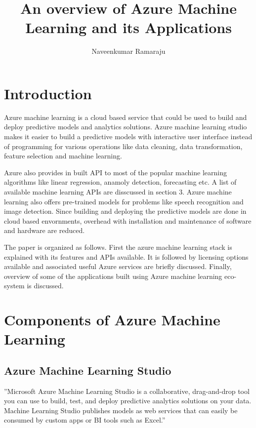 \documentclass[9pt,twocolumn,twoside]{../../styles/osajnl}
\title{An overview of Azure Machine Learning and its Applications}
\author[1]{Naveenkumar Ramaraju}
\affil[1]{School of Informatics and Computing, Bloomington, IN 47408, U.S.A.}
\affil[*]{Corresponding authors: nramraj@umail.iu.edu}
\begin{document}
\maketitle

\section{Introduction}

Azure machine learning is a cloud based service that could be used to
build and deploy predictive models and analytics solutions. Azure
machine learning studio makes it easier to build a predictive models
with interactive user interface instead of programming for various
operations like data cleaning, data transformation, feature selection
and machine learning.

Azure also provides in built API to most of the popular machine
learning algorithms like linear regression, anamoly detection,
forecasting etc. A list of available machine learning APIs are
disscussed in section 3. Azure machine learning also offers
pre-trained models for problems like speech recognition and image
detection. Since building and deploying the predictive
models are done in cloud based envornments, overhead with installation
and maintenance of software and hardware are reduced.  

The paper is organized as follows. First the azure machine learning
stack is explained with its features and APIs available. It is
followed by licensing options available and associated useful Azure
services are briefly discussed. Finally, overview of some of the
applications built using Azure machine learning eco-system is
discussed.



\section{Components of Azure Machine Learning}

\subsection{Azure Machine Learning Studio}

''Microsoft Azure Machine Learning Studio is a collaborative,
drag-and-drop tool you can use to build, test, and deploy predictive
analytics solutions on your data. Machine Learning Studio publishes
models as web services that can easily be consumed by custom apps or
BI tools such as Excel.'' \cite{www-azureMLStudioSite} 
\end{document}
